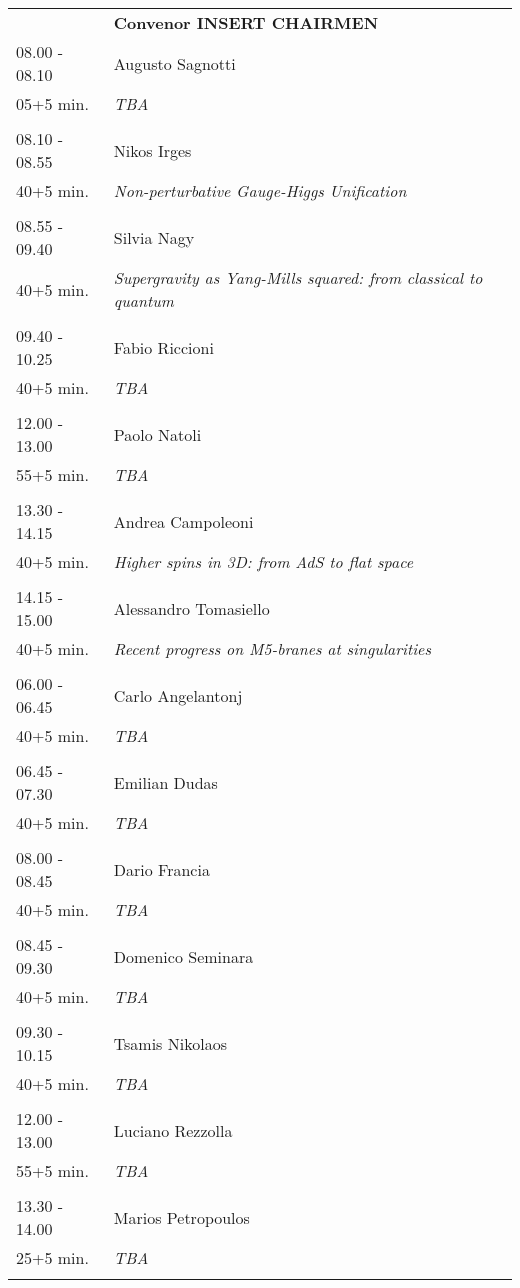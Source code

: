 \begin{longtable}{p{3cm}p{13cm}}
&\hfill {\bf Convenor INSERT CHAIRMEN }\\ 
08.00 - 08.10 & Augusto Sagnotti\\ 
05+5 min. & {\it TBA}\\ 
 & \\ 
08.10 - 08.55 & Nikos Irges\\ 
40+5 min. & {\it Non-perturbative Gauge-Higgs Unification}\\ 
 & \\ 
08.55 - 09.40 & Silvia Nagy\\ 
40+5 min. & {\it Supergravity as Yang-Mills squared: from classical to quantum}\\ 
 & \\ 
09.40 - 10.25 & Fabio Riccioni\\ 
40+5 min. & {\it TBA}\\ 
 & \\ 
12.00 - 13.00 & Paolo Natoli\\ 
55+5 min. & {\it TBA}\\ 
 & \\ 
13.30 - 14.15 & Andrea Campoleoni\\ 
40+5 min. & {\it Higher spins in 3D: from AdS to flat space}\\ 
 & \\ 
14.15 - 15.00 & Alessandro Tomasiello\\ 
40+5 min. & {\it Recent progress on M5-branes at singularities}\\ 
 & \\ 
06.00 - 06.45 & Carlo Angelantonj\\ 
40+5 min. & {\it TBA}\\ 
 & \\ 
06.45 - 07.30 & Emilian Dudas\\ 
40+5 min. & {\it TBA}\\ 
 & \\ 
08.00 - 08.45 & Dario Francia\\ 
40+5 min. & {\it TBA}\\ 
 & \\ 
08.45 - 09.30 & Domenico Seminara\\ 
40+5 min. & {\it TBA}\\ 
 & \\ 
09.30 - 10.15 & Tsamis Nikolaos\\ 
40+5 min. & {\it TBA}\\ 
 & \\ 
12.00 - 13.00 & Luciano Rezzolla\\ 
55+5 min. & {\it TBA}\\ 
 & \\ 
13.30 - 14.00 & Marios Petropoulos\\ 
25+5 min. & {\it TBA}\\ 
 & \\ 
\end{longtable}


